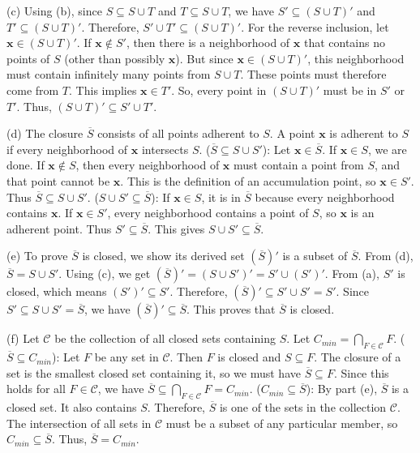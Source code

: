 (c) Using (b), since $S \subseteq S \cup T$ and $T \subseteq S \cup T$, we have $S' \subseteq (S \cup T)'$ and $T' \subseteq (S \cup T)'$. Therefore, $S' \cup T' \subseteq (S \cup T)'$. For the reverse inclusion, let $\mathbf{x} \in (S \cup T)'$. If $\mathbf{x} \notin S'$, then there is a neighborhood of $\mathbf{x}$ that contains no points of $S$ (other than possibly $\mathbf{x}$). But since $\mathbf{x} \in (S \cup T)'$, this neighborhood must contain infinitely many points from $S \cup T$. These points must therefore come from $T$. This implies $\mathbf{x} \in T'$. So, every point in $(S \cup T)'$ must be in $S'$ or $T'$. Thus, $(S \cup T)' \subseteq S' \cup T'$.

(d) The closure $\overline{S}$ consists of all points adherent to $S$. A point $\mathbf{x}$ is adherent to $S$ if every neighborhood of $\mathbf{x}$ intersects $S$.
($\overline{S} \subseteq S \cup S'$): Let $\mathbf{x} \in \overline{S}$. If $\mathbf{x} \in S$, we are done. If $\mathbf{x} \notin S$, then every neighborhood of $\mathbf{x}$ must contain a point from $S$, and that point cannot be $\mathbf{x}$. This is the definition of an accumulation point, so $\mathbf{x} \in S'$. Thus $\overline{S} \subseteq S \cup S'$.
($S \cup S' \subseteq \overline{S}$): If $\mathbf{x} \in S$, it is in $\overline{S}$ because every neighborhood contains $\mathbf{x}$. If $\mathbf{x} \in S'$, every neighborhood contains a point of $S$, so $\mathbf{x}$ is an adherent point. Thus $S' \subseteq \overline{S}$. This gives $S \cup S' \subseteq \overline{S}$.

(e) To prove $\overline{S}$ is closed, we show its derived set $(\overline{S})'$ is a subset of $\overline{S}$. From (d), $\overline{S} = S \cup S'$. Using (c), we get $(\overline{S})' = (S \cup S')' = S' \cup (S')'$. From (a), $S'$ is closed, which means $(S')' \subseteq S'$. Therefore, $(\overline{S})' \subseteq S' \cup S' = S'$. Since $S' \subseteq S \cup S' = \overline{S}$, we have $(\overline{S})' \subseteq \overline{S}$. This proves that $\overline{S}$ is closed.

(f) Let $\mathcal{C}$ be the collection of all closed sets containing $S$. Let $C_{min} = \bigcap_{F \in \mathcal{C}} F$.
($\overline{S} \subseteq C_{min}$): Let $F$ be any set in $\mathcal{C}$. Then $F$ is closed and $S \subseteq F$. The closure of a set is the smallest closed set containing it, so we must have $\overline{S} \subseteq F$. Since this holds for all $F \in \mathcal{C}$, we have $\overline{S} \subseteq \bigcap_{F \in \mathcal{C}} F = C_{min}$.
($C_{min} \subseteq \overline{S}$): By part (e), $\overline{S}$ is a closed set. It also contains $S$. Therefore, $\overline{S}$ is one of the sets in the collection $\mathcal{C}$. The intersection of all sets in $\mathcal{C}$ must be a subset of any particular member, so $C_{min} \subseteq \overline{S}$.
Thus, $\overline{S} = C_{min}$.


